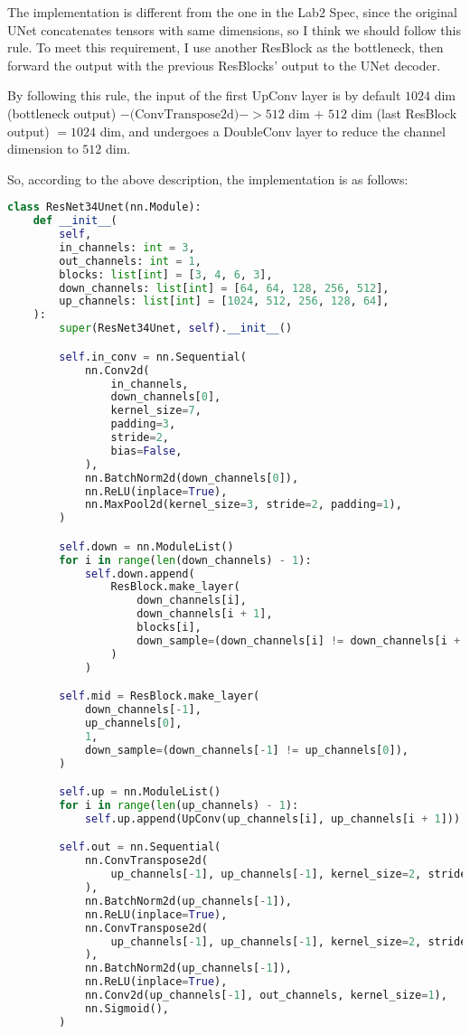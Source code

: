 The implementation is different from the one in the Lab2 Spec, since the original UNet concatenates tensors with same dimensions, so I think we should follow this rule.
To meet this requirement, I use another ResBlock as the bottleneck, then forward the output with the previous ResBlocks' output to the UNet decoder.

By following this rule, the input of the first UpConv layer is by default $1024$ dim (bottleneck output) $-\text{(ConvTranspose2d)}-> 512$ dim $+$ $512$ dim (last ResBlock output) $= 1024$ dim, and undergoes a DoubleConv layer to reduce the channel dimension to $512$ dim.

So, according to the above description, the implementation is as follows:
\begin{lstlisting}[language=Python, caption=models/resnet34\_unet.py: ResNet34Unet, label=lst:resnet34_unet]
class ResNet34Unet(nn.Module):
    def __init__(
        self,
        in_channels: int = 3,
        out_channels: int = 1,
        blocks: list[int] = [3, 4, 6, 3],
        down_channels: list[int] = [64, 64, 128, 256, 512],
        up_channels: list[int] = [1024, 512, 256, 128, 64],
    ):
        super(ResNet34Unet, self).__init__()

        self.in_conv = nn.Sequential(
            nn.Conv2d(
                in_channels,
                down_channels[0],
                kernel_size=7,
                padding=3,
                stride=2,
                bias=False,
            ),
            nn.BatchNorm2d(down_channels[0]),
            nn.ReLU(inplace=True),
            nn.MaxPool2d(kernel_size=3, stride=2, padding=1),
        )

        self.down = nn.ModuleList()
        for i in range(len(down_channels) - 1):
            self.down.append(
                ResBlock.make_layer(
                    down_channels[i],
                    down_channels[i + 1],
                    blocks[i],
                    down_sample=(down_channels[i] != down_channels[i + 1]),
                )
            )

        self.mid = ResBlock.make_layer(
            down_channels[-1],
            up_channels[0],
            1,
            down_sample=(down_channels[-1] != up_channels[0]),
        )

        self.up = nn.ModuleList()
        for i in range(len(up_channels) - 1):
            self.up.append(UpConv(up_channels[i], up_channels[i + 1]))

        self.out = nn.Sequential(
            nn.ConvTranspose2d(
                up_channels[-1], up_channels[-1], kernel_size=2, stride=2
            ),
            nn.BatchNorm2d(up_channels[-1]),
            nn.ReLU(inplace=True),
            nn.ConvTranspose2d(
                up_channels[-1], up_channels[-1], kernel_size=2, stride=2
            ),
            nn.BatchNorm2d(up_channels[-1]),
            nn.ReLU(inplace=True),
            nn.Conv2d(up_channels[-1], out_channels, kernel_size=1),
            nn.Sigmoid(),
        )


\end{lstlisting}
